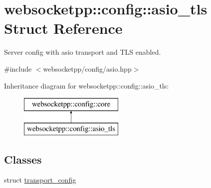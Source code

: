 \hypertarget{structwebsocketpp_1_1config_1_1asio__tls}{}\section{websocketpp\+:\+:config\+:\+:asio\+\_\+tls Struct Reference}
\label{structwebsocketpp_1_1config_1_1asio__tls}


Server config with asio transport and T\+L\+S enabled.  




{\ttfamily \#include $<$websocketpp/config/asio.\+hpp$>$}

Inheritance diagram for websocketpp\+:\+:config\+:\+:asio\+\_\+tls\+:\begin{figure}[H]
\begin{center}
\leavevmode
\includegraphics[height=2.000000cm]{structwebsocketpp_1_1config_1_1asio__tls}
\end{center}
\end{figure}
\subsection*{Classes}
\begin{DoxyCompactItemize}
\item 
struct \hyperlink{structwebsocketpp_1_1config_1_1asio__tls_1_1transport__config}{transport\+\_\+config}
\end{DoxyCompactItemize}
